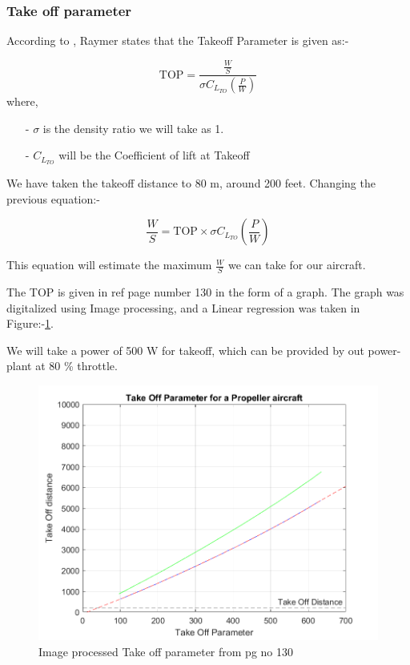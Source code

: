 \documentclass[12 pt]{article}
\begin{document}

\subsubsection{Take off parameter}

According to \cite{Raymer2006}, Raymer states that the Takeoff Parameter is given as:- 

$$\text{TOP} = \frac{\frac{W}{S}}{ \sigma C_{L_{TO}} \left( \frac{P}{W} \right) }$$
where,
\begin{itemize}
    \item[-] $\sigma$ is the density ratio we will take as 1.
    \item [-] $C_{L_{TO}}$ will be the Coefficient of lift at Takeoff 
\end{itemize}

We have taken the takeoff distance to 80 m, around 200 feet. Changing the previous equation:-

$$ \frac{W}{S} = \text{TOP} \times \sigma C_{L_{TO}} \left( \frac{P}{W} \right) $$

This equation will estimate the maximum $\frac{W}{S}$ we can take for our aircraft.

The TOP is given in ref \cite{Raymer. 2006} page number 130 in the form of a graph. The graph was digitalized using Image processing, and a Linear regression was taken in Figure:-\ref{Image processed Take off parameter}. 

We will take a power of 500 W for takeoff, which can be provided by out power-plant at 80 \% throttle. 

\begin{figure}[h]
    \centering
    \includegraphics[width=0.8\linewidth]{Codes/Week 2/Takeoffparam.png}
    \caption{Image processed Take off parameter from \protect\cite{Raymer2006} pg no 130}
    \label{Image processed Take off parameter}
\end{figure}
\end{document}
